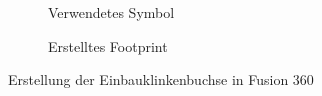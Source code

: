 \begin{figure}[h]
	\centering
	\begin{subfigure}{.5\textwidth}
	\centering
	\setlength{\fboxsep}{1pt} %
	\setlength{\fboxrule}{1pt} %
	\caption{Verwendetes Symbol}
	\label{fig:Klinkenbuchse Symbol}
	\end{subfigure}%
	\begin{subfigure}{.5\textwidth}
	\centering
	\setlength{\fboxsep}{1pt} %
	\setlength{\fboxrule}{1pt} %
	\caption{Erstelltes Footprint}
	\label{fig:Klinkenbuchse Footprint}
	\end{subfigure}
	\caption{Erstellung der Einbauklinkenbuchse in Fusion 360}
	\label{fig:Einbauklinkenbuchse in Fusion 360}
\end{figure}


